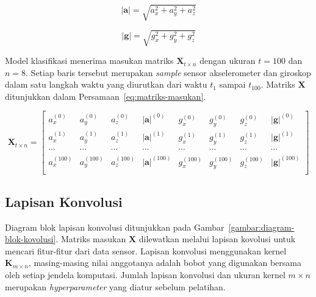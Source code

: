 \begin{equation}
    \label{eq:norm-akselerometer}
    |\pmb{a}| = \sqrt{a_x^2 + a_y^2 + a_z^2}
\end{equation}

\begin{equation}
    \label{eq:norm-giroskop}
    |\pmb{g}| = \sqrt{g_x^2 + g_y^2 + g_z^2}
\end{equation}

Model klasifikasi menerima masukan matriks $\pmb{X}_{t \times n}$ dengan ukuran $t = 100$ dan $n = 8$. Setiap baris tersebut merupakan \textit{sample} sensor akselerometer dan giroskop dalam satu langkah waktu yang diurutkan dari waktu $t_1$ sampai $t_{100}$. Matriks $\pmb{X}$ ditunjukkan dalam Persamaan~\ref{eq:matriks-masukan}.

\begin{equation}
    \label{eq:matriks-masukan}
    \pmb{X}_{t \times n} =
    \begin{bmatrix}
        a_x^{(0)} & a_y^{(0)} & a_z^{(0)} & |\pmb{a}|^{(0)} & g_x^{(0)} & g_y^{(0)} & g_z^{(0)} & |\pmb{g}|^{(0)} \\
        a_x^{(1)} & a_y^{(1)} & a_z^{(1)} & |\pmb{a}|^{(1)} & g_x^{(1)} & g_y^{(1)} & g_z^{(1)} & |\pmb{g}|^{(1)} \\
        \cdots & \cdots & \cdots & \cdots & \cdots & \cdots & \cdots & \cdots \\
        a_x^{(100)} & a_y^{(100)} & a_z^{(100)} & |\pmb{a}|^{(100)} & g_x^{(100)} & g_y^{(100)} & g_z^{(100)} & |\pmb{g}|^{(100)} \\
        
    \end{bmatrix}
\end{equation}

\subsection{Lapisan Konvolusi}
Diagram blok lapisan konvolusi ditunjukkan pada Gambar~\ref{gambar:diagram-blok-kovolusi}. Matriks masukan $\pmb{X}$ dilewatkan melalui lapisan kovolusi untuk mencari fitur-fitur dari data sensor. Lapisan konvolusi menggunakan kernel $\pmb{K}_{m \times n}$, masing-masing nilai anggotanya adalah bobot yang digunakan bersama oleh setiap jendela komputasi. Jumlah lapisan konvolusi dan ukuran kernel $m \times n$ merupakan \textit{hyperparameter} yang diatur sebelum pelatihan.

